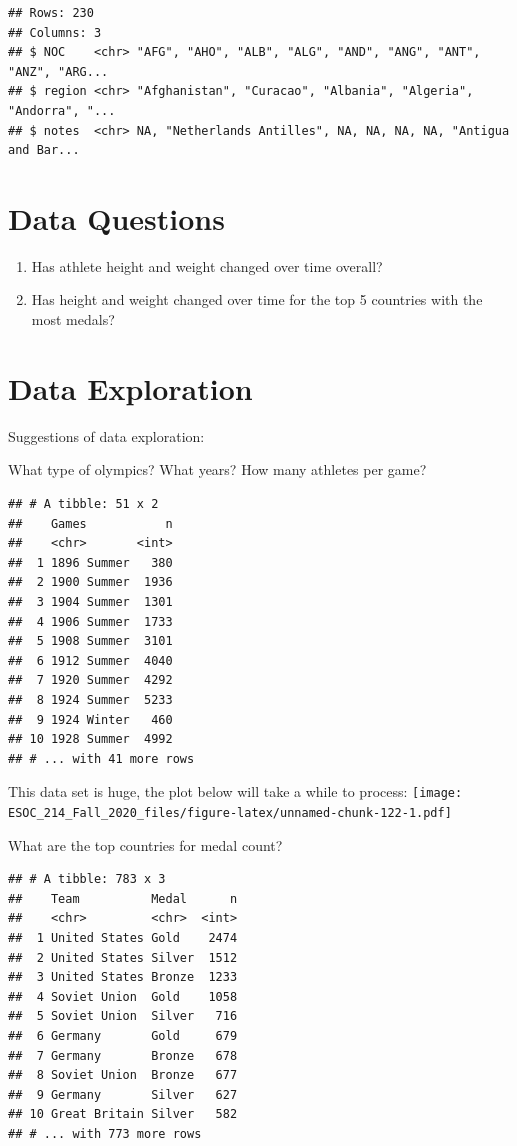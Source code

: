 \documentclass[
]{book}
\begin{document}
\begin{verbatim}
## Rows: 230
## Columns: 3
## $ NOC    <chr> "AFG", "AHO", "ALB", "ALG", "AND", "ANG", "ANT", "ANZ", "ARG...
## $ region <chr> "Afghanistan", "Curacao", "Albania", "Algeria", "Andorra", "...
## $ notes  <chr> NA, "Netherlands Antilles", NA, NA, NA, NA, "Antigua and Bar...
\end{verbatim}

\hypertarget{data-questions}{%
\section{Data Questions}\label{data-questions}}

\begin{enumerate}
\def\labelenumi{\arabic{enumi})}
\item
  Has athlete height and weight changed over time overall?
\item
  Has height and weight changed over time for the top 5 countries with the most medals?
\end{enumerate}

\hypertarget{data-exploration}{%
\section{Data Exploration}\label{data-exploration}}

Suggestions of data exploration:

What type of olympics? What years? How many athletes per game?

\begin{verbatim}
## # A tibble: 51 x 2
##    Games           n
##    <chr>       <int>
##  1 1896 Summer   380
##  2 1900 Summer  1936
##  3 1904 Summer  1301
##  4 1906 Summer  1733
##  5 1908 Summer  3101
##  6 1912 Summer  4040
##  7 1920 Summer  4292
##  8 1924 Summer  5233
##  9 1924 Winter   460
## 10 1928 Summer  4992
## # ... with 41 more rows
\end{verbatim}

This data set is huge, the plot below will take a while to process:
\texttt{[image: ESOC\_214\_Fall\_2020\_files/figure-latex/unnamed-chunk-122-1.pdf]}

What are the top countries for medal count?

\begin{verbatim}
## # A tibble: 783 x 3
##    Team          Medal      n
##    <chr>         <chr>  <int>
##  1 United States Gold    2474
##  2 United States Silver  1512
##  3 United States Bronze  1233
##  4 Soviet Union  Gold    1058
##  5 Soviet Union  Silver   716
##  6 Germany       Gold     679
##  7 Germany       Bronze   678
##  8 Soviet Union  Bronze   677
##  9 Germany       Silver   627
## 10 Great Britain Silver   582
## # ... with 773 more rows
\end{verbatim}
\end{document}
